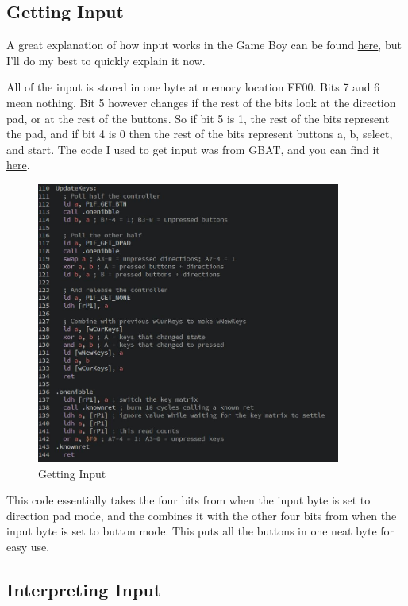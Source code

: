 \documentclass{article}
\begin{document}
\subsection{Getting Input}

A great explanation of how input works in the Game Boy can be found \href{https://www.youtube.com/watch?v=ecTQVa42sJc}{here}, but I'll do my best to quickly explain it now. 

All of the input is stored in one byte at memory location FF00. Bits 7 and 6 mean nothing. Bit 5 however changes if the rest of the bits look at the direction pad, or at the rest of the buttons. So if bit 5 is 1, the rest of the bits represent the pad, and if bit 4 is 0 then the rest of the bits represent buttons a, b, select, and start. The code I used to get input was from GBAT, and you can find it \href{https://gbdev.io/gb-asm-tutorial/part2/input.html}{here}.

\begin{figure}[htp]
    \centering
    \includegraphics[width=10cm]{images/InputCode.JPG}
    \caption{Getting Input}
    \label{Get Input code}
\end{figure}

This code essentially takes the four bits from when the input byte is set to direction pad mode, and the combines it with the other four bits from when the input byte is set to button mode. This puts all the buttons in one neat byte for easy use.

\subsection{Interpreting Input}
\end{document}
